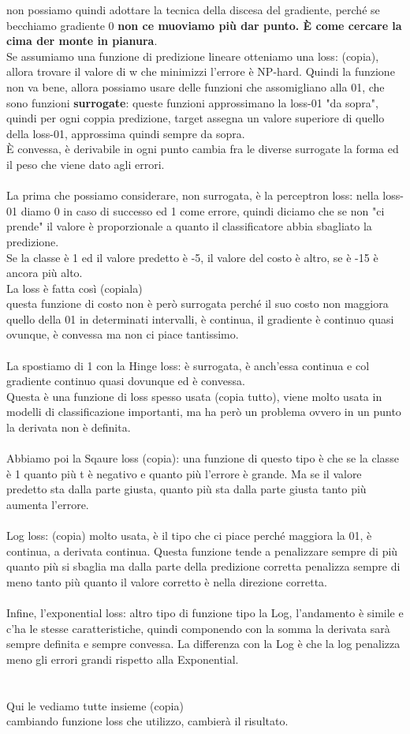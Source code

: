 \documentclass[12pt, oneside]{extbook}
\begin{document}
non possiamo quindi adottare la tecnica della discesa del gradiente, perché se becchiamo gradiente 0 \textbf{non ce muoviamo più dar punto. È come cercare la cima der monte in pianura}.\\Se assumiamo una funzione di predizione lineare otteniamo una loss: (copia), allora trovare il valore di w che minimizzi l'errore è NP-hard. Quindi la funzione non va bene, allora possiamo usare delle funzioni che assomigliano alla 01, che sono funzioni \textbf{surrogate}: queste funzioni approssimano la loss-01 "da sopra", quindi per ogni coppia predizione, target assegna un valore superiore di quello della loss-01, approssima quindi sempre da sopra.\\È convessa, è derivabile in ogni punto cambia fra le diverse surrogate la forma ed il peso che viene dato agli errori.\\\\La prima che possiamo considerare, non surrogata, è la perceptron loss: nella loss-01 diamo 0 in caso di successo ed 1 come errore, quindi diciamo che se non "ci prende" il valore è proporzionale a quanto il classificatore abbia sbagliato la predizione.\\Se la classe è 1 ed il valore predetto è -5, il valore del costo è altro, se è -15 è ancora più alto.\\La loss è fatta così (copiala)\\questa funzione di costo non è però surrogata perché il suo costo non maggiora quello della 01 in determinati intervalli, è continua, il gradiente è continuo quasi ovunque, è convessa ma non ci piace tantissimo.\\\\La spostiamo di 1 con la Hinge loss: è surrogata, è anch'essa continua e col gradiente continuo quasi dovunque ed è convessa.\\Questa è una funzione di loss spesso usata (copia tutto), viene molto usata in modelli di classificazione importanti, ma ha però un problema ovvero in un punto la derivata non è definita.\\\\Abbiamo poi la Sqaure loss (copia): una funzione di questo tipo è che se la classe è 1 quanto più t è negativo e quanto più l'errore è grande. Ma se il valore predetto sta dalla parte giusta, quanto più sta dalla parte giusta tanto più aumenta l'errore.\\\\Log loss: (copia) molto usata, è il tipo che ci piace perché maggiora la 01, è continua, a derivata continua. Questa funzione tende a penalizzare sempre di più quanto più si sbaglia ma dalla parte della predizione corretta penalizza sempre di meno tanto più quanto il valore corretto è nella direzione corretta.\\\\Infine, l'exponential loss: altro tipo di funzione tipo la Log, l'andamento è simile e c'ha le stesse caratteristiche, quindi componendo con la somma la derivata sarà sempre definita e sempre convessa. La differenza con la Log è che la log penalizza meno gli errori grandi rispetto alla Exponential.\\\\\\Qui le vediamo tutte insieme (copia)\\cambiando funzione loss che utilizzo, cambierà il risultato.
\end{document}
